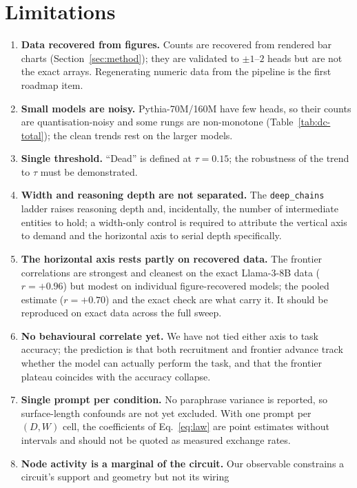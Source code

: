 \documentclass[11pt]{article}
\begin{document}
\section{Limitations}
\begin{enumerate}[leftmargin=1.4em,itemsep=2pt]
\item \textbf{Data recovered from figures.} Counts are recovered from rendered
bar charts (Section~\ref{sec:method}); they are validated to $\pm1$--$2$ heads
but are not the exact arrays. Regenerating numeric data from the pipeline is
the first roadmap item.
\item \textbf{Small models are noisy.} Pythia-70M/160M have few heads, so
their counts are quantisation-noisy and some rungs are non-monotone
(Table~\ref{tab:dc-total}); the clean trends rest on the larger models.
\item \textbf{Single threshold.} ``Dead'' is defined at $\tau=0.15$; the
robustness of the trend to $\tau$ must be demonstrated.
\item \textbf{Width and reasoning depth are not separated.} The
\texttt{deep\_chains} ladder raises reasoning depth and, incidentally, the
number of intermediate entities to hold; a width-only control is required to
attribute the vertical axis to demand and the horizontal axis to serial depth
specifically.
\item \textbf{The horizontal axis rests partly on recovered data.} The
frontier correlations are strongest and cleanest on the exact Llama-3-8B data
($r{=}{+}0.96$) but modest on individual figure-recovered models; the pooled
estimate ($r{=}{+}0.70$) and the exact check are what carry it. It should be
reproduced on exact data across the full sweep.
\item \textbf{No behavioural correlate yet.} We have not tied either axis to
task accuracy; the prediction is that both recruitment and frontier advance
track whether the model can actually perform the task, and that the frontier
plateau coincides with the accuracy collapse.
\item \textbf{Single prompt per condition.} No paraphrase variance is
reported, so surface-length confounds are not yet excluded. With one prompt per
$(D,W)$ cell, the coefficients of Eq.~\eqref{eq:law} are point estimates
without intervals and should not be quoted as measured exchange rates.
\item \textbf{Node activity is a marginal of the circuit.} Our observable
constrains a circuit's support and geometry but not its wiring

\end{enumerate}
\end{document}
